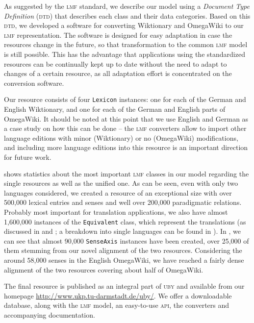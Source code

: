 \documentclass[output=paper]{LSP/langsci}
\begin{document}
As suggested by the \textsc{lmf} standard, we describe our model using a \emph{Document Type Definition} (\textsc{dtd}) that describes each class and their data categories. Based on this \textsc{dtd}, we developed a software for converting Wiktionary and OmegaWiki to our \textsc{lmf} representation. The software is designed for easy adaptation in case the resources change in the future, so that transformation to the common \textsc{lmf} model is still possible. This has the advantage that applications using the standardized resources can be continually kept up to date without the need to adapt to changes of a certain resource, as all adaptation effort is concentrated on the conversion software.

Our resource consists of four \texttt{Lexicon} instances: one for each of the German and English Wiktionary, and one for each of the German and English parts of OmegaWiki. It should be noted at this point that we use English and German as a case study on how this can be done -- the \textsc{lmf} converters allow to import other language editions with minor (Wiktionary) or no (OmegaWiki) modifications, and including more language editions into this resource is an important direction for future work. 

 shows statistics about the most important \textsc{lmf} classes in our model regarding the single resources as well as the unified one. As can be seen, even with only two languages considered, we created a resource of an exceptional size with over 500,000 lexical entries and senses and well over 200,000 paradigmatic relations. Probably most important for translation applications, we also have almost 1,600,000 instances of the \texttt{Equivalent} class, which represent the translations (as discussed in  and ; a breakdown into single languages can be found in ). In , we can see that  almost 90,000 \texttt{SenseAxis} instances have been created, over 25,000 of them stemming from our novel alignment of the two resources. Considering the around 58,000 senses in the English OmegaWiki, we have reached a fairly dense alignment of the two resources covering about half of OmegaWiki.

The final resource is published as an integral part of \textsc{uby} and available from our homepage \url{http://www.ukp.tu-darmstadt.de/uby/}. We offer a downloadable database, along with the \textsc{lmf} model, an easy-to-use \textsc{api}, the converters and accompanying documentation.
\end{document}
